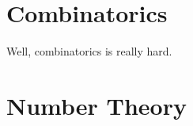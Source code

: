 \documentclass[a4paper]{article}
\begin{document}
%

%
\section{Combinatorics}
Well, combinatorics is really hard.

\newpage
\section{Number Theory}
\newpage
\end{document}
